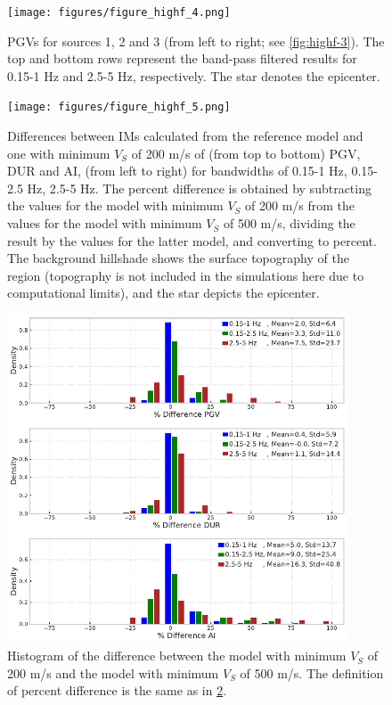\begin{figure}[!ht]
  \texttt{[image: figures/figure\_highf\_4.png]}
  \caption{PGVs for sources 1, 2 and 3 (from left to right; see \cref{fig:highf-3}). The top and bottom rows represent the band-pass filtered results for 0.15-1 Hz and 2.5-5 Hz, respectively. The star denotes the epicenter.}
  \label{fig:highf-4}
\end{figure}
\clearpage

\begin{figure}[!ht]
  \centering
  \texttt{[image: figures/figure\_highf\_5.png]}
  \caption{Differences between IMs calculated from the reference model and one with minimum $V_S$ of 200 m/s of (from top to bottom) PGV, DUR and AI, (from left to right) for bandwidths of 0.15-1 Hz, 0.15-2.5 Hz, 2.5-5 Hz. The percent difference is obtained by subtracting the values for the model with minimum $V_S$ of 200 m/s from the values for the model with minimum $V_S$ of 500 m/s, dividing the result by the values for the latter model, and converting to percent. The background hillshade shows the surface topography of the region (topography is not included in the simulations here due to computational limits), and the star depicts the epicenter.}
  \label{fig:highf-5}
\end{figure}
\clearpage

\begin{figure}[!ht]
  \centering
  \includegraphics[width=0.9\textwidth,height=0.9\textheight,keepaspectratio]{figures/figure_highf_6.pdf}
  \caption{Histogram of the difference between the model with minimum $V_S$ of 200 m/s and the model with minimum $V_S$ of 500 m/s. The definition of percent difference is the same as in \cref{fig:highf-5}.
  }
  \label{fig:highf-6}
\end{figure}
\clearpage

